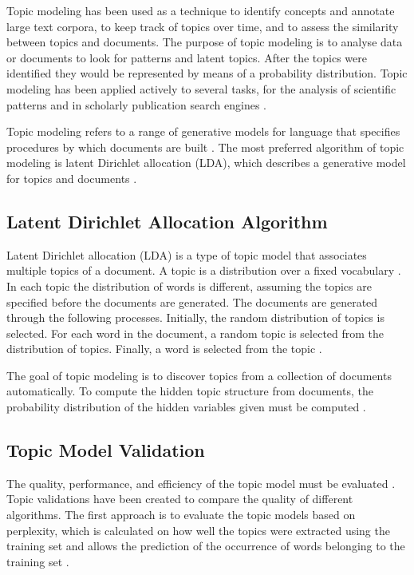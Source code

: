 Topic modeling has been used as a technique to identify concepts and annotate large text corpora, to keep track of topics over time, and to assess the similarity between topics and documents. The purpose of topic modeling is to analyse data or documents to look for patterns and latent topics. After the topics were identified they would be represented by means of a probability distribution. Topic modeling has been applied actively to several tasks, for the analysis of scientific patterns \cite{lau2012line,yi2009comparative,wei2006lda,yi2009comparative} and in scholarly publication search engines \cite{newman2010evaluating}.

Topic modeling refers to a range of generative models for language that specifies procedures by which documents are built \cite{blei2003latent}. The most preferred algorithm of topic modeling is latent Dirichlet allocation (LDA), which describes a generative model for topics and documents \cite{blei2003latent}.

\subsection{Latent Dirichlet Allocation Algorithm} \label{ssec:LDAA}

Latent Dirichlet allocation (LDA) is a type of topic model that associates multiple topics of a document. A topic is a distribution over a fixed vocabulary \cite{chaney2012visualizing}. In each topic the distribution of words is different, assuming the topics are specified before the documents are generated. The documents are generated through the following processes. Initially, the random distribution of topics is selected. For each word in the document, a random topic is selected from the distribution of topics. Finally, a word is selected from the topic \cite{blei2003latent,mekonnen2017topic}.

The goal of topic modeling is to discover topics from a collection of documents automatically. To compute the hidden topic structure from documents, the probability distribution of the hidden variables given must be computed \cite{mimno2012sparse}.

\subsection{Topic Model Validation}

The quality, performance, and efficiency of the topic model must be evaluated \cite{ramirez2012topic}. Topic validations have been created to compare the quality of different algorithms. The first approach is to evaluate the topic models based on perplexity, which is calculated on how well the topics were extracted using the training set and allows the prediction of the occurrence of words belonging to the training set \cite{ramirez2012topic}.

